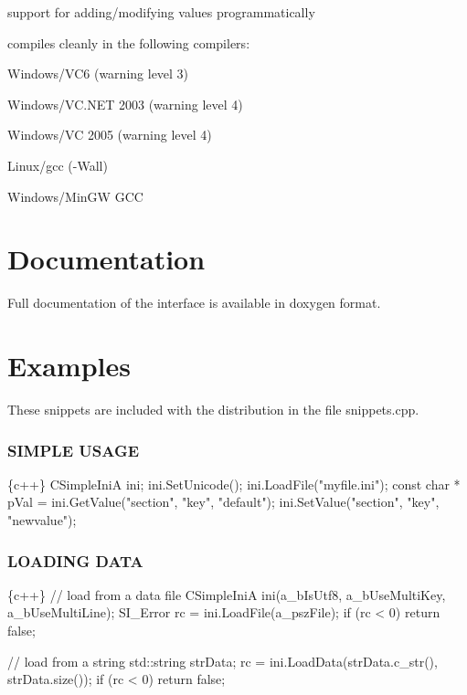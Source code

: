 \begin{DoxyItemize}
\item support for adding/modifying values programmatically
\item compiles cleanly in the following compilers\+:
\begin{DoxyItemize}
\item Windows/\+V\+C6 (warning level 3)
\item Windows/\+V\+C.\+N\+ET 2003 (warning level 4)
\item Windows/\+VC 2005 (warning level 4)
\item Linux/gcc (-\/\+Wall)
\item Windows/\+Min\+GW G\+CC
\end{DoxyItemize}
\end{DoxyItemize}

\section*{Documentation}

Full documentation of the interface is available in doxygen format.

\section*{Examples}

These snippets are included with the distribution in the file snippets.\+cpp.

\subsubsection*{S\+I\+M\+P\+LE U\+S\+A\+GE}


\begin{DoxyCode}
\{c++\}
CSimpleIniA ini;
ini.SetUnicode();
ini.LoadFile("myfile.ini");
const char * pVal = ini.GetValue("section", "key", "default");
ini.SetValue("section", "key", "newvalue");
\end{DoxyCode}


\subsubsection*{L\+O\+A\+D\+I\+NG D\+A\+TA}


\begin{DoxyCode}
\{c++\}
// load from a data file
CSimpleIniA ini(a\_bIsUtf8, a\_bUseMultiKey, a\_bUseMultiLine);
SI\_Error rc = ini.LoadFile(a\_pszFile);
if (rc < 0) return false;

// load from a string
std::string strData;
rc = ini.LoadData(strData.c\_str(), strData.size());
if (rc < 0) return false;
\end{DoxyCode}


